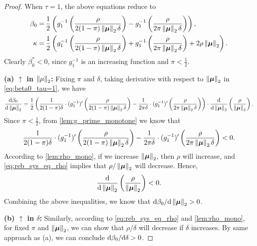 \begin{proof}
When $\tau = 1$, the above equations reduce to
\begin{align}
	\beta_0 = \, & \frac{1}{2} \left( g_1^{-1} \left( \frac{\rho}{2 (1 - \pi) \left\|{\text{\boldmath $\mu$}}\right\|_2 \delta} \right) - g_1^{-1} \left( \frac{\rho}{2 \pi \left\|{\text{\boldmath $\mu$}}\right\|_2 \delta} \right) \right), 
    \label{eq:beta0_tau=1}
    \\
	\kappa = \, & \frac{1}{2} \left( g_1^{-1} \left( \frac{\rho}{2 (1 - \pi) \left\|{\text{\boldmath $\mu$}}\right\|_2 \delta} \right) + g_1^{-1} \left( \frac{\rho}{2 \pi \left\|{\text{\boldmath $\mu$}}\right\|_2 \delta} \right) + 2 \rho \left\|{\text{\boldmath $\mu$}}\right\|_2 \right).
    \notag
\end{align}
Clearly $\beta_0^* < 0$, since $g_1^{-1}$ is an increasing function and $\pi < \frac12$.

\vspace{0.5\baselineskip}
\noindent
\textbf{(a) $\boldsymbol{\uparrow}$ in $\left\|{\mu}\right\|_2$:}
Fixing $\pi$ and $\delta$, taking derivative with respect to $\left\|{\text{\boldmath $\mu$}}\right\|_2$ in \cref{eq:beta0_tau=1}, we have
	\begin{equation*}
		\frac{\textup{d} \beta_0}{\textup{d} \left\|{\text{\boldmath $\mu$}}\right\|_2} = \frac{1}{2} \left( \frac{1}{2 (1 - \pi) \delta} \cdot (g_1^{-1})' \left( \frac{\rho}{2 (1 - \pi) \left\|{\text{\boldmath $\mu$}}\right\|_2 \delta} \right) - \frac{1}{2 \pi \delta} \cdot (g_1^{-1})' \left( \frac{\rho}{2 \pi \left\|{\text{\boldmath $\mu$}}\right\|_2 \delta} \right) \right) \cdot \frac{\textup{d}}{\textup{d} \left\|{\text{\boldmath $\mu$}}\right\|_2} \left( \frac{\rho}{\left\|{\text{\boldmath $\mu$}}\right\|_2} \right).
	\end{equation*}
	Since $\pi < \frac12$, from \cref{lem:g_prime_monotone} we know that
	\begin{equation*}
		\frac{1}{2 (1 - \pi) \delta} \cdot (g_1^{-1})' \left( \frac{\rho}{2 (1 - \pi) \left\|{\text{\boldmath $\mu$}}\right\|_2 \delta} \right) - \frac{1}{2 \pi \delta} \cdot (g_1^{-1})' \left( \frac{\rho}{2 \pi \left\|{\text{\boldmath $\mu$}}\right\|_2 \delta} \right) < 0.
	\end{equation*}
	According to \cref{lem:rho_mono}, if we increase $\left\|{\text{\boldmath $\mu$}}\right\|_2$, then $\rho$ will increase, and \cref{eq:reb_sys_eq_rho} implies that $\rho / \left\|{\text{\boldmath $\mu$}}\right\|_2$ will decrease. Hence,
	\begin{equation*}
		\frac{\textup{d}}{\textup{d} \left\|{\text{\boldmath $\mu$}}\right\|_2} \left( \frac{\rho}{\left\|{\text{\boldmath $\mu$}}\right\|_2} \right) < 0.
	\end{equation*}
	Combining the above inequalities, we know that $\textup{d} \beta_0 / \textup{d} \left\|{\text{\boldmath $\mu$}}\right\|_2 > 0$.

\vspace{0.5\baselineskip}
\noindent
\textbf{(b) $\boldsymbol{\uparrow}$ in $\delta$:}
Similarly, according to \cref{eq:reb_sys_eq_rho} and \cref{lem:rho_mono}, for fixed $\pi$ and $\left\|{\text{\boldmath $\mu$}}\right\|_2$, we can show that $\rho / \delta$ will decrease if $\delta$ increases. By same approach as (a), we can conclude $\textup{d} \beta_0 / \textup{d} \delta > 0$.


\end{proof}
